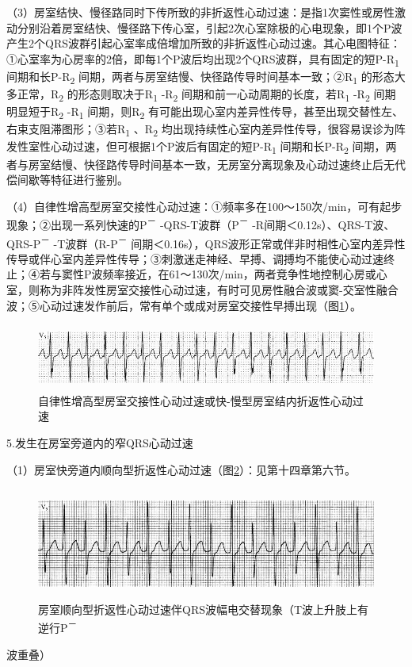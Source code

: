 （3）房室结快、慢径路同时下传所致的非折返性心动过速：是指1次窦性或房性激动分别沿着房室结快、慢径路下传心室，引起2次心室除极的心电现象，即1个P波产生2个QRS波群引起心室率成倍增加所致的非折返性心动过速。其心电图特征：①心室率为心房率的2倍，即每1个P波后均出现2个QRS波群，具有固定的短P-R\textsubscript{1}
间期和长P-R\textsubscript{2}
间期，两者与房室结慢、快径路传导时间基本一致；②R\textsubscript{1}
的形态大多正常，R\textsubscript{2} 的形态则取决于R\textsubscript{1}
-R\textsubscript{2} 间期和前一心动周期的长度，若R\textsubscript{1}
-R\textsubscript{2} 间期明显短于R\textsubscript{2} -R\textsubscript{1}
间期，则R\textsubscript{2}
有可能出现心室内差异性传导，甚至出现交替性左、右束支阻滞图形；③若R\textsubscript{1}
、R\textsubscript{2}
均出现持续性心室内差异性传导，很容易误诊为阵发性室性心动过速，但可根据1个P波后有固定的短P-R\textsubscript{1}
间期和长P-R\textsubscript{2}
间期，两者与房室结慢、快径路传导时间基本一致，无房室分离现象及心动过速终止后无代偿间歇等特征进行鉴别。

（4）自律性增高型房室交接性心动过速：①频率多在100～150次/min，可有起步现象；②出现一系列快速的P\textsuperscript{－}
-QRS-T波群（P\textsuperscript{－}
-R间期＜0.12s）、QRS-T波、QRS-P\textsuperscript{－}
-T波群（R-P\textsuperscript{－}
间期＜0.16s），QRS波形正常或伴非时相性心室内差异性传导或伴心室内差异性传导；③刺激迷走神经、早搏、调搏均不能使心动过速终止；④若与窦性P波频率接近，在61～130次/min，两者竞争性地控制心房或心室，则称为非阵发性房室交接性心动过速，有时可见房性融合波或窦-交室性融合波；⑤心动过速发作前后，常有单个或成对房室交接性早搏出现（图\ref{fig32-10}）。

\begin{figure}[!htbp]
 \centering
 \includegraphics[width=5.58333in,height=0.85417in]{./images/Image00526.jpg}
 \captionsetup{justification=centering}
 \caption{自律性增高型房室交接性心动过速或快-慢型房室结内折返性心动过速}
 \label{fig32-10}
  \end{figure} 

5.发生在房室旁道内的窄QRS心动过速

（1）房室快旁道内顺向型折返性心动过速（图\ref{fig32-11}）：见第十四章第六节。

\begin{figure}[!htbp]
 \centering
 \includegraphics[width=5.58333in,height=1.4375in]{./images/Image00527.jpg}
 \captionsetup{justification=centering}
 \caption{房室顺向型折返性心动过速伴QRS波幅电交替现象（T波上升肢上有逆行P\textsuperscript{－}}
 \label{fig32-11}
  \end{figure} 
波重叠）

